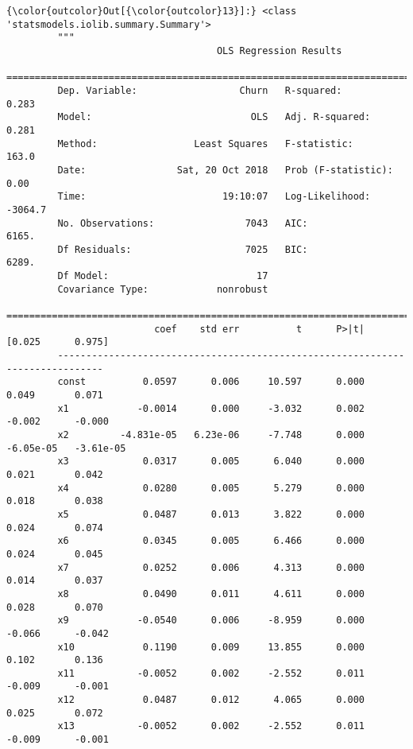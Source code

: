 \documentclass[11pt]{article}
\begin{document}
\begin{Verbatim}[commandchars=\\\{\}]
{\color{outcolor}Out[{\color{outcolor}13}]:} <class 'statsmodels.iolib.summary.Summary'>
         """
                                     OLS Regression Results                            
         ==============================================================================
         Dep. Variable:                  Churn   R-squared:                       0.283
         Model:                            OLS   Adj. R-squared:                  0.281
         Method:                 Least Squares   F-statistic:                     163.0
         Date:                Sat, 20 Oct 2018   Prob (F-statistic):               0.00
         Time:                        19:10:07   Log-Likelihood:                -3064.7
         No. Observations:                7043   AIC:                             6165.
         Df Residuals:                    7025   BIC:                             6289.
         Df Model:                          17                                         
         Covariance Type:            nonrobust                                         
         ==============================================================================
                          coef    std err          t      P>|t|      [0.025      0.975]
         ------------------------------------------------------------------------------
         const          0.0597      0.006     10.597      0.000       0.049       0.071
         x1            -0.0014      0.000     -3.032      0.002      -0.002      -0.000
         x2         -4.831e-05   6.23e-06     -7.748      0.000   -6.05e-05   -3.61e-05
         x3             0.0317      0.005      6.040      0.000       0.021       0.042
         x4             0.0280      0.005      5.279      0.000       0.018       0.038
         x5             0.0487      0.013      3.822      0.000       0.024       0.074
         x6             0.0345      0.005      6.466      0.000       0.024       0.045
         x7             0.0252      0.006      4.313      0.000       0.014       0.037
         x8             0.0490      0.011      4.611      0.000       0.028       0.070
         x9            -0.0540      0.006     -8.959      0.000      -0.066      -0.042
         x10            0.1190      0.009     13.855      0.000       0.102       0.136
         x11           -0.0052      0.002     -2.552      0.011      -0.009      -0.001
         x12            0.0487      0.012      4.065      0.000       0.025       0.072
         x13           -0.0052      0.002     -2.552      0.011      -0.009      -0.001

\end{Verbatim}
\end{document}
